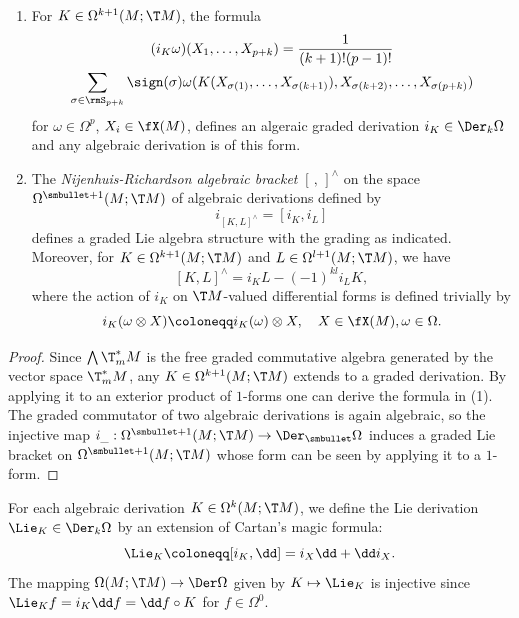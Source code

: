 \begin{prop}
    \begin{enumerate}[label=(\alph*)]
        \item For $K\in \Omega^{k+1}(M;\T M)$, the formula 
        \begin{multline}
            (i_K\omega)(X_1,\ldots,X_{p+k})=\frac{1}{(k+1)!(p-1)!}\\\sum_{\sigma\in \rmS_{p+k}}\sign(\sigma) \omega(K(X_{\sigma(1)},\ldots,X_{\sigma(k+1)}),X_{\sigma(k+2)},\ldots,X_{\sigma(p+k)})
        \end{multline}
        for $\omega\in\Omega^p$, $X_i\in\fX(M)$, defines an algeraic graded derivation $i_K\in \Der_k\Omega$ and any algebraic derivation is of this form.
        \item The \emph{Nijenhuis-Richardson algebraic bracket} $[\,,\,]^{\wedge}$ on the space $\Omega^{\smbullet +1}(M;\T M)$ of algebraic derivations defined by 
        \[i_{[K,L]^{\wedge}}= [i_K,i_L]\]
        defines a graded Lie algebra structure with the grading as indicated. Moreover, for $K\in\Omega^{k+1}(M;\T M)$ and $L\in\Omega^{l+1}(M;\T M)$, we have 
        \[[K,L]^{\wedge}=i_K L-(-1)^{kl}i_L K,\]
        where the action of $i_K$ on $\T M$-valued differential forms is defined trivially by
        \[i_K(\omega\otimes X)\coloneqq i_K(\omega)\otimes X,\quad X\in\fX(M),\omega\in\Omega.\]
    \end{enumerate}
\end{prop}
\begin{proof}
    Since $\bigwedge \T^\ast_m M$ is the free graded commutative algebra generated by the vector space $\T^\ast_m M$, any $K\in \Omega^{k+1}(M;\T M)$ extends to a graded derivation. By applying it to an exterior product of $1$-forms one can derive the formula in (1). The graded commutator of two algebraic derivations is again algebraic, so the injective map $i_{\_}:\Omega^{\smbullet +1}(M;\T M)\to \Der_{\smbullet}\Omega$ induces a graded Lie bracket on $\Omega^{\smbullet+1}(M;\T M)$ whose form can be seen by applying it to a $1$-form.
\end{proof}


\begin{defn}
    For each algebraic derivation $K\in\Omega^k(M;\T M)$, we define the Lie derivation $\Lie_K\in\Der_k\Omega$ by an extension of Cartan's magic formula:
    \[\Lie_K\coloneqq [i_K,\dd]=i_X\dd+\dd i_X.\]
    The mapping $\Omega(M;\T M)\to \Der\Omega$ given by $K\mapsto \Lie_K$ is injective since $\Lie_K f=i_K\dd f=\dd f\circ K$ for $f\in\Omega^0$.
\end{defn}

